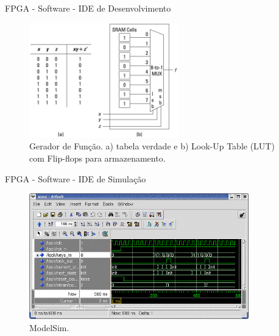 	\begin{frame}{FPGA - Software - IDE de Desenvolvimento}
		\begin{figure}[p]
			\centering
			\includegraphics[width=0.58\textwidth]{img/fpga/funcao-geradora.png}
			\caption{Gerador de Função. a) tabela verdade e b) Look-Up Table (LUT) com Flip-flops para armazenamento.}
			\label{fig:funcao-geradora}
		\end{figure}
	\end{frame}




	\begin{frame}{FPGA - Software - IDE de Simulação}
		\begin{figure}[p]
			\centering
			\includegraphics[width=0.85\textwidth]{img/fpga/modelsim.png}
			\caption{ModelSim.}
			\label{fig:modelsim}
		\end{figure}
	\end{frame}



